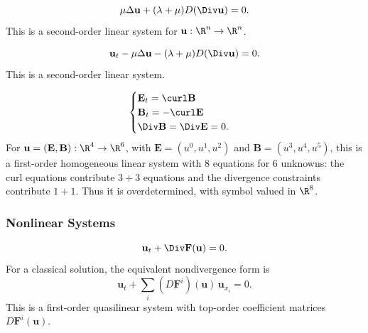 \begin{example}
\label{ex:linear-elasticity-equilibrium}
\leanok
$$\mu\Delta\mathbf{u} + (\lambda + \mu)D(\Div \mathbf{u}) = 0.$$
This is a second-order linear system for $\mathbf{u}:\R^n\to\R^n$.
\end{example}

\begin{example}
\label{ex:linear-elasticity-evolution}
\leanok
$$\mathbf{u}_t - \mu\Delta\mathbf{u} - (\lambda + \mu)D(\Div \mathbf{u}) = 0.$$
This is a second-order linear system.
\end{example}

\begin{example}
\label{ex:maxwells-equations}
\leanok
$$\begin{cases}
\mathbf{E}_t = \curl \mathbf{B} \\
\mathbf{B}_t = -\curl \mathbf{E} \\
\Div \mathbf{B} = \Div \mathbf{E} = 0.
\end{cases}$$
For $\mathbf{u}=(\mathbf{E},\mathbf{B}):\R^4\to\R^6$, with
$\mathbf{E}=(u^0,u^1,u^2)$ and $\mathbf{B}=(u^3,u^4,u^5)$, this is a
first-order homogeneous linear system with $8$ equations for $6$ unknowns:
the curl equations contribute $3+3$ equations and the divergence constraints
contribute $1+1$. Thus it is overdetermined, with symbol valued in $\R^8$.
\end{example}

\subsubsection{Nonlinear Systems}
\label{sec:examples-nonlinear-systems}

\begin{example}
\label{ex:system-conservation-laws}
\leanok
$$\mathbf{u}_t + \Div \mathbf{F}(\mathbf{u}) = 0.$$
For a classical solution, the equivalent nondivergence form is
$$\mathbf{u}_t + \sum_i (D\mathbf{F}^i)(\mathbf{u})\,\mathbf{u}_{x_i} = 0.$$
This is a first-order quasilinear system with top-order coefficient matrices
$D\mathbf{F}^i(\mathbf{u})$.
\end{example}

